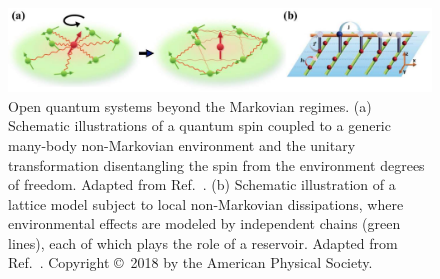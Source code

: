 \documentclass{tADP2e}
\theoremstyle{plain}
\theoremstyle{plain}
\theoremstyle{definition}
\begin{document}
\begin{figure}[t]
\begin{center}
\includegraphics[width=14.5cm]{./Figures/fig_4_nonmarkov.pdf}
\end{center}
\caption{Open quantum systems beyond the Markovian regimes. (a) Schematic illustrations of a quantum spin coupled to a generic many-body non-Markovian environment and the unitary transformation disentangling the spin from the environment degrees of freedom. Adapted from Ref.~\cite{YA18B}.   
(b) Schematic illustration of a lattice model subject to local non-Markovian dissipations, where environmental effects are modeled by independent  chains (green lines), each of which plays the role of a reservoir. Adapted from Ref.~\cite{YZ18}. Copyright \copyright\, 2018 by the American Physical Society. }
\label{fig:4nonmarkov}
\end{figure}
\end{document}
